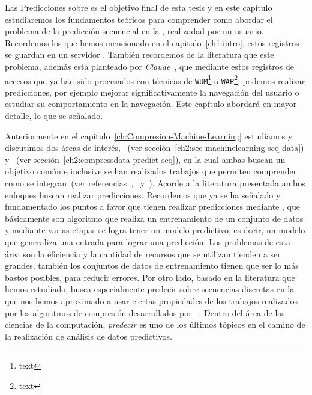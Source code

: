 


Las Predicciones sobre \webasccesslog es el objetivo final de esta tesis y en este capítulo estudiaremos los fundamentos teóricos para comprender como abordar el problema de la predicción secuencial en la \web, realizadad por un usuario. Recordemos los \webasccesslog que hemos mencionado en el capitulo~\ref{ch1:intro}, estos registros se guardan en un servidor \web. También recordemos de la literatura que este problema, además esta planteado por \emph{Claude}~\etal\cite{Claude2014}, que mediante estos registros de accesos que ya han sido procesados con técnicas de \texttt{WUM}\footnote{text} o \texttt{WAP}\footnote{text}, podemos realizar predicciones, por ejemplo mejorar significativamente la navegación del usuario o estudiar su comportamiento en la navegación. Este capítulo abordará en mayor detalle, lo que se señalado.
\newline

Anteriormente en el capitulo~\ref{ch:Compresion-Machine-Learning} estudiamos y discutimos dos áreas de interés,  \machinelearning~(ver sección~\ref{ch2:sec-machinelearning-seq-data}) y  \losslessdatacompression~(ver sección~\ref{ch2:compressdata-predict-seq}), en la cual ambas buscan un objetivo común e inclusive se han realizados trabajos que permiten comprender como se integran~(ver referencias~\cite{Sculley2006},~\cite{Li2005} y~\cite{Begleiter2004}). Acorde a la literatura presentada ambos enfoques buscan realizar predicciones. Recordemos que ya se ha señalado y fundamentado los puntos a favor que tienen realizar predicciones mediante \machinelearning, que  básicamente son algoritmo que realiza un entrenamiento de un conjunto de datos y mediante varias etapas se logra tener un modelo predictivo, es decir, un modelo que generaliza una entrada para lograr una predicción. Los problemas de esta área son la eficiencia y la cantidad de recursos que se utilizan tienden a ser grandes, también los conjuntos de datos de entrenamiento tienen que ser lo más bastos posibles, para reducir errores. Por otro lado, \losslessdatacompression basado en la literatura que hemos estudiado, busca especialmente predecir sobre secuencias discretas en la que nos hemos aproximado a usar ciertas propiedades de los trabajos realizados por los algoritmos de compresión desarrollados por \lempelziv~\cite{ZivLempel1978}. Dentro del área de las ciencias de la computación, \emph{predecir} es uno de los últimos tópicos en el camino de la realización de análisis de datos predictivos.

